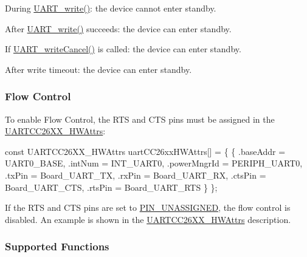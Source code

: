 \begin{DoxyItemize}
\begin{DoxyItemize}
\end{DoxyItemize}
\item During \hyperlink{_u_a_r_t_8h_a6f2a04c09dc17886e69e361cd80aaedc}{U\+A\+R\+T\+\_\+write()}\+: the device cannot enter standby.
\item After \hyperlink{_u_a_r_t_8h_a6f2a04c09dc17886e69e361cd80aaedc}{U\+A\+R\+T\+\_\+write()} succeeds\+: the device can enter standby.
\item If \hyperlink{_u_a_r_t_8h_a0482cd0ab9ee7e802c8e785a5754d16d}{U\+A\+R\+T\+\_\+write\+Cancel()} is called\+: the device can enter standby.
\item After write timeout\+: the device can enter standby.
\end{DoxyItemize}

\subsubsection*{Flow Control}

To enable Flow Control, the R\+T\+S and C\+T\+S pins must be assigned in the \hyperlink{struct_u_a_r_t_c_c26_x_x___h_w_attrs}{U\+A\+R\+T\+C\+C26\+X\+X\+\_\+\+H\+W\+Attrs}\+: 
\begin{DoxyCode}
\textcolor{keyword}{const} UARTCC26XX_HWAttrs uartCC26xxHWAttrs[] = \{
    \{
        .baseAddr    = UART0\_BASE,
        .intNum      = INT\_UART0,
        .powerMngrId = PERIPH\_UART0,
        .txPin       = Board\_UART\_TX,
        .rxPin       = Board\_UART\_RX,
        .ctsPin      = Board\_UART\_CTS,
        .rtsPin      = Board\_UART\_RTS
    \}
\};
\end{DoxyCode}


If the R\+T\+S and C\+T\+S pins are set to \hyperlink{_p_i_n_8h_aba219226dfdc9ea2fb82d6a7995395bf}{P\+I\+N\+\_\+\+U\+N\+A\+S\+S\+I\+G\+N\+E\+D}, the flow control is disabled. An example is shown in the \hyperlink{struct_u_a_r_t_c_c26_x_x___h_w_attrs}{U\+A\+R\+T\+C\+C26\+X\+X\+\_\+\+H\+W\+Attrs} description.

\subsubsection*{Supported Functions}

